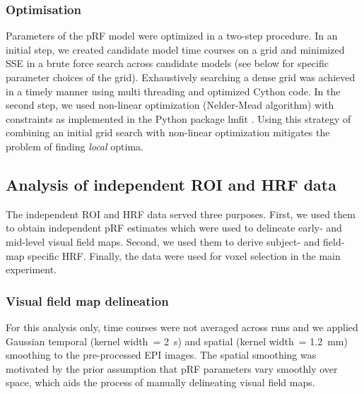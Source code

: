 \subsubsection{Optimisation}
Parameters of the pRF model were optimized in a two-step procedure. In an initial step, we created candidate model time courses on a grid and minimized SSE in a brute force search across candidate models (see below for specific parameter choices of the grid). Exhaustively searching a dense grid was achieved in a timely manner using multi threading and optimized Cython code. In the second step, we used non-linear optimization (Nelder-Mead algorithm) with constraints as implemented in the Python package lmfit \parencite{scipy2001, lmfit2018}. Using this strategy of combining an initial grid search with non-linear optimization mitigates the problem of finding \textit{local} optima.

\subsection{Analysis of independent ROI and HRF data}
The independent ROI and HRF data served three purposes. First, we used them to obtain independent pRF estimates which were used to delineate early- and mid-level visual field maps. Second, we used them to derive subject- and field-map specific HRF. Finally, the data were used for voxel selection in the main experiment.

\subsubsection{Visual field map delineation}
For this analysis only, time courses were not averaged across runs and we applied Gaussian temporal (kernel width~= 2~s) and spatial (kernel width~= 1.2~mm) smoothing to the pre-processed EPI images. The spatial smoothing was motivated by the prior assumption that pRF parameters vary smoothly over space, which aids the process of manually delineating visual field maps.

